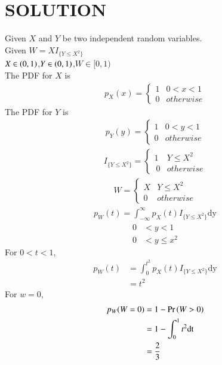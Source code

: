 \documentclass[journal,12pt,twocolumn]{IEEEtran}
\begin{document}
\section*{SOLUTION}
Given $X$ and $Y$ be two independent random variables. \\
Given $W=XI_{\{Y\leq X^2\}}$ \\
$X \in \left(0,1\right)$,$Y \in \left(0,1\right)$,$W \in [0,1)$\\
The PDF for $X$ is
\begin{align}
p_X(x) = 
\begin{cases}
     1 & 0 < x  < 1\\
     0 & otherwise \label{1}
\end{cases}
\end{align}
The PDF for $Y$ is
\begin{align}
p_{Y}(y)  = 
\begin{cases}
      1 & 0 < y < 1 \\
      0 & otherwise \label{2}
\end{cases}
\end{align}
\begin{align}
I_{\{Y\leq X^2\}} =
\begin{cases}
    1 & Y\leq X^2\\\
    0 & otherwise \label{3}
\end{cases}
\end{align}
\begin{align}
W  = 
\begin{cases}
    X & Y \leq X^2 \\
    0 & otherwise \label{4}
\end{cases}
\end{align}
\begin{align}
p_{W}(t) = \int_{- \infty}^{\infty} p_X(t)I_{\{Y\leq X^2\}} \mathrm{dy}
\end{align}
\begin{align}
   0 &< y < 1 \label{4} \\
   0 &< y \leq x^2  \label{5}
\end{align}
For $ 0 < t < 1 $,
\begin{align}
p_W(t) &= \int_{0}^{t^2} p_X(t)I_{\{Y\leq X^2\}} \mathrm{dy} \\
       &= t^2 \label{8}
\end{align}
For $ w=0 $,
\begin{align}
p_W(W=0) &= 1- \Pr\left(W>0\right) \\
         &=1 - \int_0^1 t^2 \mathrm{dt} \\
         &=\frac{2}{3}\label{9}
\end{align}
\end{document}
